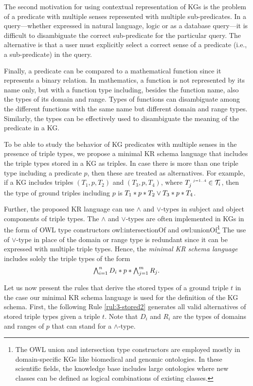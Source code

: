 \documentclass[runningheads]{llncs}
\newcommand{\s}{\scriptscriptstyle\ \,}
\newcommand{\T}{{\cal T}}
\begin{document}
The second motivation for using contextual representation of KGs is
the problem of a predicate with multiple senses represented with
multiple sub-predicates. In a query---whether expressed in natural
language, logic or as a database query---it is difficult to
disambiguate the correct sub-predicate for the particular query. The
alternative is that a user must explicitly select a correct sense of
a predicate (i.e., a sub-predicate) in the query.

Finally, a predicate can be compared to a mathematical function since
it represents a binary relation. In mathematics, a function is not
represented by its name only, but with a function type including,
besides the function name, also the types of its domain and
range. Types of functions can disambiguate among the different
functions with the same name but different domain and range
types. Similarly, the types can be effectively used to disambiguate
the meaning of the predicate in a KG.

To be able to study the behavior of KG predicates with multiple senses
in the presence of triple types, we propose a minimal KR schema
language that includes the triple types stored in a KG as triples. In
case there is more than one triple type including a predicate $p$,
then these are treated as alternatives. For example, if a KG includes
triples $(T_1,p,T_2)$ and $(T_3,p,T_4)$, where
$T_j^{\s\/j=1..4}\in\T_i$, then the type of ground triples including
$p$ is $T_1*p*T_2\lor\/T_3*p*T_4$.

Further, the proposed KR language can use $\land$ and $\lor$-types in
subject and object components of triple types. The $\land$ and
$\lor$-types are often implemented in KGs in the form of OWL type
constructors owl:intersectionOf and owl:unionOf\footnote{The OWL union
  and intersection type constructors are employed mostly in
  domain-specific KGs like biomedical and genomic ontologies. In these
  scientific fields, the knowledge base includes large ontologies
  where new classes can be defined as logical combinations of existing
  classes.} The use of $\lor$-type in place of the domain or range
type is redundant since it can be expressed with multiple triple
types. Hence, the \emph{minimal KR schema language} includes solely
the triple types of the form
$$\textstyle\bigwedge_{i=1}^n\/D_i*p*\bigwedge_{j=1}^m\/R_j.$$

Let us now present the rules that derive the stored types of a ground
triple $t$ in the case our minimal KR schema language is used for the
definition of the KG schema. First, the following Rule
\ref{rul:3-stored2} generates all valid alternatives of stored triple
types given a triple $t$. Note that $D_i$ and $R_i$ are the types of
domains and ranges of $p$ that can stand for a $\land$-type.
\end{document}

